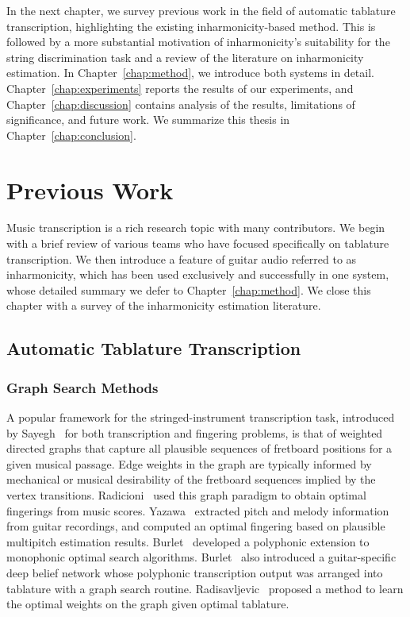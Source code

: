 \documentclass[12pt]{cmuthesis}
\begin{document}
In the next chapter, we survey previous work in the field of automatic tablature transcription, highlighting the existing inharmonicity-based method. This is followed by a more substantial motivation of inharmonicity's suitability for the string discrimination task and a review of the literature on inharmonicity estimation. In Chapter~\ref{chap:method}, we introduce both systems in detail. Chapter~\ref{chap:experiments} reports the results of our experiments, and Chapter~\ref{chap:discussion} contains analysis of the results, limitations of significance, and future work. We summarize this thesis in Chapter~\ref{chap:conclusion}.

\noindent
\chapter{Previous Work}
\label{chap:lit-review}
Music transcription is a rich research topic with many contributors. We begin with a brief review of various teams who have focused specifically on tablature transcription. We then introduce a feature of guitar audio referred to as inharmonicity, which has been used exclusively and successfully in one system, whose detailed summary we defer to Chapter~\ref{chap:method}. We close this chapter with a survey of the inharmonicity estimation literature.

\section{Automatic Tablature Transcription}
\subsection{Graph Search Methods}
A popular framework for the stringed-instrument transcription task, introduced by Sayegh~\cite{sayegh1989} for both transcription and fingering problems, is that of weighted directed graphs that capture all plausible sequences of fretboard positions for a given musical passage. Edge weights in the graph are typically informed by mechanical or musical desirability of the fretboard sequences implied by the vertex transitions. Radicioni~\cite{radicioni2005} used this graph paradigm to obtain optimal fingerings from music scores. Yazawa~\cite{yazawa2013} extracted pitch and melody information from guitar recordings, and computed an optimal fingering based on plausible multipitch estimation results. Burlet~\cite{burlet2013} developed a polyphonic extension to monophonic optimal search algorithms. Burlet~\cite{burlet2015} also introduced a guitar-specific deep belief network whose polyphonic transcription output was arranged into tablature with a graph search routine. Radisavljevic~\cite{radisav2004} proposed a method to learn the optimal weights on the graph given optimal tablature.
\end{document}

